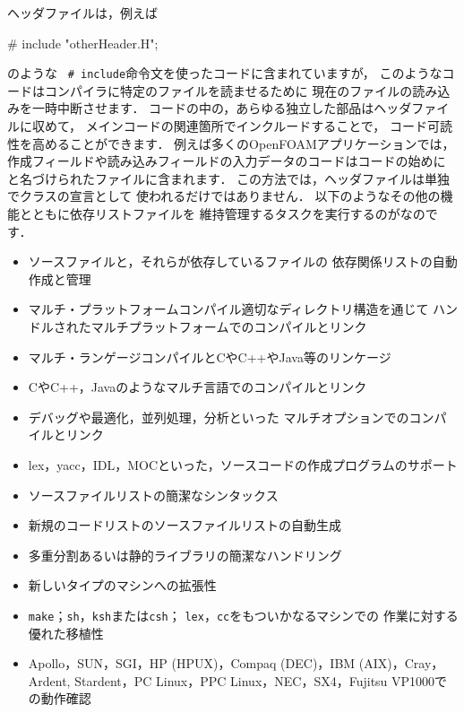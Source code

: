ヘッダファイルは，例えば
\begin{OFverbatim}[file]
# include "otherHeader.H";
\end{OFverbatim}
のような\ 
%
%
\verb|# include|命令文を使ったコードに含まれていますが，
このようなコードはコンパイラに特定のファイルを読ませるために
現在のファイルの読み込みを一時中断させます．
コードの中の，あらゆる独立した部品はヘッダファイルに収めて，
メインコードの関連箇所でインクルードすることで，
コード可読性を高めることができます．
例えば多くのOpenFOAMアプリケーションでは，
作成フィールドや読み込みフィールドの入力データのコードはコードの始めに
と名づけられたファイルに含まれます．
この方法では，ヘッダファイルは単独でクラスの宣言として
使われるだけではありません．
以下のようなその他の機能とともに依存リストファイルを
維持管理するタスクを実行するのがなのです．
\begin{itemize}
 \item ソースファイルと，それらが依存しているファイルの
       依存関係リストの自動作成と管理
 \item マルチ・プラットフォームコンパイル適切なディレクトリ構造を通じて
       ハンドルされたマルチプラットフォームでのコンパイルとリンク
 \item マルチ・ランゲージコンパイルとCやC++やJava等のリンケージ
 \item CやC++，Javaのようなマルチ言語でのコンパイルとリンク
 \item デバッグや最適化，並列処理，分析といった
       マルチオプションでのコンパイルとリンク
 \item lex，yacc，IDL，MOCといった，ソースコードの作成プログラムのサポート
 \item ソースファイルリストの簡潔なシンタックス
 \item 新規のコードリストのソースファイルリストの自動生成
 \item 多重分割あるいは静的ライブラリの簡潔なハンドリング
 \item 新しいタイプのマシンへの拡張性
 \item \texttt{make}；\texttt{sh}，\texttt{ksh}または\texttt{csh}；
       \texttt{lex}，\texttt{cc}をもついかなるマシンでの
       作業に対する優れた移植性
 \item Apollo，SUN，SGI，HP (HPUX)，Compaq (DEC)，IBM (AIX)，Cray，Ardent,
       Stardent，PC Linux，PPC Linux，NEC，SX4，Fujitsu VP1000での動作確認
\end{itemize}


